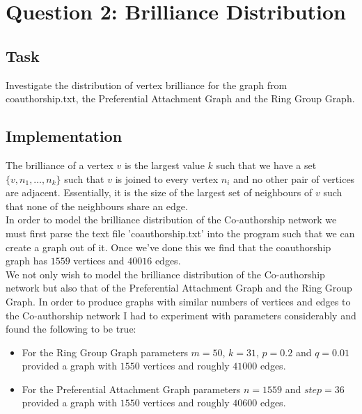 \documentclass[12pt, a4paper]{article}
\begin{document}
\section*{Question 2: Brilliance Distribution}
\subsection*{Task}
Investigate the distribution of vertex brilliance for the graph from coauthorship.txt, the Preferential Attachment Graph and the Ring Group Graph.
\subsection*{Implementation}
The brilliance of a vertex $v$ is the largest value $k$ such that we have a set $\{v, n_1, \dots, n_k\}$ such that $v$ is joined to every vertex $n_i$ and no other pair of vertices are adjacent. Essentially, it is the size of the largest set of neighbours of $v$ such that none of the neighbours share an edge.\\

In order to  model the brilliance distribution of the Co-authorship network we must first parse the text file 'coauthorship.txt' into the program such that we can create a graph out of it. Once we've done this we find that the coauthorship graph has $1559$ vertices and $40016$ edges.\\ 
We not only wish to model the brilliance distribution of the Co-authorship network but also that of the Preferential Attachment Graph and the Ring Group Graph. In order to produce graphs with similar numbers of vertices and edges to the Co-authorship network I had to experiment with parameters considerably and found the following to be true:\\
\begin{itemize}
\item For the Ring Group Graph parameters $m=50$, $k=31$, $p=0.2$ and $q=0.01$ provided a graph with $1550$ vertices and roughly $41000$ edges.
\item For the Preferential Attachment Graph parameters $n=1559$ and $step =36$ provided a graph with $1550$ vertices and roughly $40600$ edges.
\end{itemize}
\end{document}
